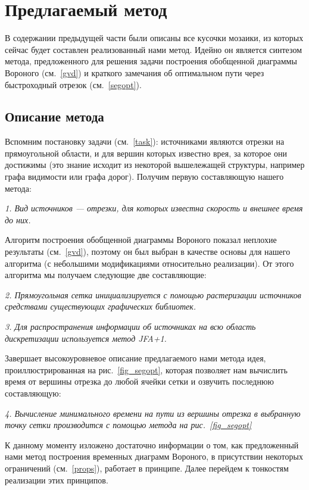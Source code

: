 \documentclass[12pt]{article}
\begin{document}
\section{Предлагаемый метод}
В содержании предыдущей части были описаны все кусочки мозаики, из которых 
сейчас будет составлен реализованный нами метод. Идейно он является синтезом
метода, предложенного для решения задачи построения обобщенной диаграммы Вороного 
(см.~\ref{gvd}) и краткого замечания об оптимальном пути через быстроходный 
отрезок (см.~\ref{segopt}).

\subsection{Описание метода}
Вспомним постановку задачи (см.~\ref{task}): источниками являются отрезки на прямоугольной
области, и для вершин которых известно врея, за которое они достижимы (это знание исходит из
некоторой вышележащей структуры, например графа видимости или графа дорог). Получим 
первую  составляющую нашего метода:

\emph{1. Вид источников --- отрезки, для которых известна скорость 
и внешнее время до них.}

Алгоритм построения обобщенной диаграммы Вороного показал неплохие
результаты (см.~\ref{gvd}), поэтому он был выбран в качестве основы 
для нашего алгоритма (с небольшими модификациями относительно реализации).
От этого алгоритма мы получаем следующие две составляющие:

\emph{2. Прямоугольная сетка инициализируется с помощью растеризации
источников средствами существующих графических библиотек.}

\emph{3. Для распространения информации об источниках на всю
область дискретизации используется метод JFA+1.}

Завершает высокоуровневое описание предлагаемого нами метода
идея, проиллюстрированная на рис.~\ref{fig_segopt}, которая позволяет нам
вычислить время от вершины отрезка до любой ячейки сетки и озвучить
последнюю составляющую:

\emph{4. Вычисление минимального времени на пути из вершины отрезка
в выбранную точку сетки производится с помощью метода на рис.~\ref{fig_segopt}}

К данному моменту изложено достаточно информации о том, как предложенный 
нами метод построения временных диаграмм Вороного, в присутствии некоторых 
ограничений (см.~\ref{props}), работает в принципе. Далее перейдем к 
тонкостям реализации этих принципов.
\end{document}

